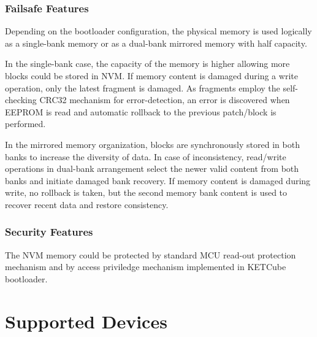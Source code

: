  
\subsubsection{Failsafe Features}\label{sec:arch:EEPROMMap:failsafe} 
 
 Depending on the bootloader configuration, the physical memory is used logically as a single-bank memory or as a dual-bank mirrored memory with half capacity. 

 
 In the single-bank case, the capacity of the memory is higher allowing more blocks could be stored in NVM. 
 If memory content is damaged during a write operation, only the latest fragment is damaged. 
 As fragments employ the self-checking CRC32 mechanism for error-detection, an error is discovered when EEPROM is read and automatic rollback to the previous patch/block is performed.

 In the mirrored memory organization, blocks are synchronously stored in both banks to increase the diversity of data. 
 In case of inconsistency, read/write operations in dual-bank arrangement select the newer valid content from both banks and initiate damaged bank recovery.
 If memory content is damaged during write, no rollback is taken, but the second memory bank content is used to recover recent data and restore consistency.
 
 
\subsubsection{Security Features}\label{sec:arch:EEPROMMap:sec}

The NVM memory could be protected by standard MCU read-out protection mechanism and by access priviledge mechanism implemented in KETCube bootloader.


\clearpage
\section{Supported Devices}\label{sec:supportedDevices}

